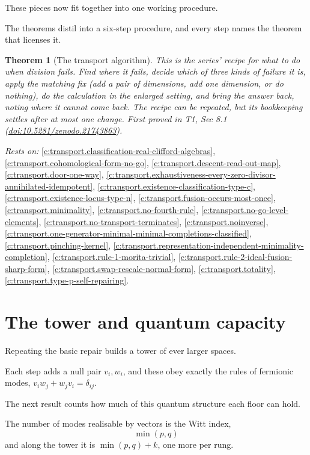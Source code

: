 \documentclass[11pt]{article}
\newtheorem{theorem}{Theorem}[section]
\theoremstyle{definition}
\theoremstyle{plain}
\begin{document}
These pieces now fit together into one working procedure.

The theorems distil into a six-step procedure, and every step names the theorem that licenses it.

\begin{theorem}[The transport algorithm]\label{c:transport.transport-algorithm}
This is the series' recipe for what to do when division fails. Find where it fails, decide which of three kinds of failure it is, apply the matching fix (add a pair of dimensions, add one dimension, or do nothing), do the calculation in the enlarged setting, and bring the answer back, noting where it cannot come back. The recipe can be repeated, but its bookkeeping settles after at most one change.
\emph{First proved in} T1, Sec 8.1 (\href{https://doi.org/10.5281/zenodo.21743863}{doi:10.5281/zenodo.21743863}).
\end{theorem}
\noindent\emph{Rests on:} \ref{c:transport.classification-real-clifford-algebras}, \ref{c:transport.cohomological-form-no-go}, \ref{c:transport.descent-read-out-map}, \ref{c:transport.door-one-way}, \ref{c:transport.exhaustiveness-every-zero-divisor-annihilated-idempotent}, \ref{c:transport.existence-classification-type-c}, \ref{c:transport.existence-locus-type-n}, \ref{c:transport.fusion-occurs-most-once}, \ref{c:transport.minimality}, \ref{c:transport.no-fourth-rule}, \ref{c:transport.no-go-level-elements}, \ref{c:transport.no-transport-terminates}, \ref{c:transport.noinverse}, \ref{c:transport.one-generator-minimal-minimal-completions-classified}, \ref{c:transport.pinching-kernel}, \ref{c:transport.representation-independent-minimality-completion}, \ref{c:transport.rule-1-morita-trivial}, \ref{c:transport.rule-2-ideal-fusion-sharp-form}, \ref{c:transport.swap-rescale-normal-form}, \ref{c:transport.totality}, \ref{c:transport.type-p-self-repairing}.

\section{The tower and quantum capacity}

Repeating the basic repair builds a tower of ever larger spaces.

Each step adds a null pair $v_i, w_i$, and these obey exactly the rules of fermionic modes, $v_i w_j + w_j v_i = \delta_{ij}$.

The next result counts how much of this quantum structure each floor can hold.

The number of modes realisable by vectors is the Witt index, \[ \min(p,q) \] and along the tower it is $\min(p,q) + k$, one more per rung.
\end{document}

